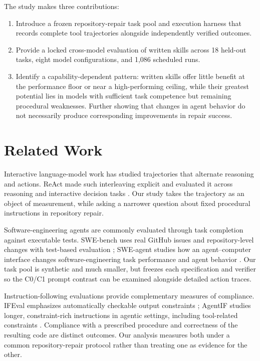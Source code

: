\documentclass[10pt]{article}
\begin{document}
The study makes three contributions:
\begin{enumerate}[leftmargin=1.4em,itemsep=1pt,topsep=2pt]
\item Introduce a frozen repository-repair task pool and execution harness that records complete tool trajectories alongside independently verified outcomes.

\item Provide a locked cross-model evaluation of written skills across 18 held-out tasks, eight model configurations, and 1,086 scheduled runs.

\item Identify a capability-dependent pattern: written skills offer little benefit at the performance floor or near a high-performing ceiling, while their greatest potential lies in models with sufficient task competence but remaining procedural weaknesses. Further showing that changes in agent behavior do not necessarily produce corresponding improvements in repair success.
\end{enumerate}

\section{Related Work}
Interactive language-model work has studied trajectories that alternate reasoning and actions. ReAct made such interleaving explicit and evaluated it across reasoning and interactive decision tasks \citep{yao2023react}. Our study takes the trajectory as an object of measurement, while asking a narrower question about fixed procedural instructions in repository repair.

Software-engineering agents are commonly evaluated through task completion against executable tests. SWE-bench uses real GitHub issues and repository-level changes with test-based evaluation \citep{jimenez2024swebench}; SWE-agent studies how an agent--computer interface changes software-engineering task performance and agent behavior \citep{yang2024sweagent}. Our task pool is synthetic and much smaller, but freezes each specification and verifier so the C0/C1 prompt contrast can be examined alongside detailed action traces.

Instruction-following evaluations provide complementary measures of compliance. IFEval emphasizes automatically checkable output constraints \citep{zhou2023ifeval}; AgentIF studies longer, constraint-rich instructions in agentic settings, including tool-related constraints \citep{qi2025agentif}. Compliance with a prescribed procedure and correctness of the resulting code are distinct outcomes. Our analysis measures both under a common repository-repair protocol rather than treating one as evidence for the other.
\end{document}
